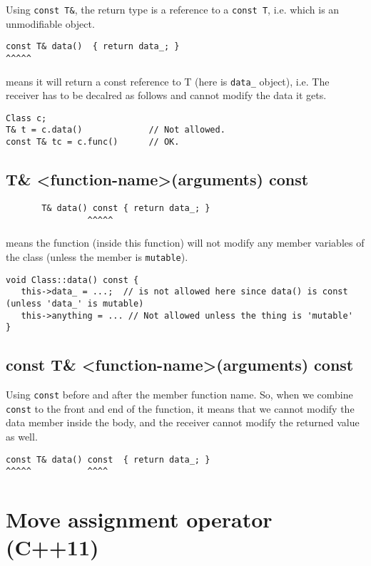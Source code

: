 Using \verb!const T&!, the return type is a reference to a \verb!const T!, i.e.
which is an unmodifiable object.

\begin{verbatim}
const T& data()  { return data_; }
^^^^^
\end{verbatim}
means it will return a const reference to T (here is \verb!data_! object), i.e.
The receiver has to be decalred as follows and cannot modify the data it gets.
\begin{verbatim}
Class c;
T& t = c.data()             // Not allowed.
const T& tc = c.func()      // OK.
\end{verbatim}


\subsection{T\& <function-name>(arguments) const}

\begin{verbatim}
       T& data() const { return data_; }
                ^^^^^
\end{verbatim}
means the function (inside this function) will not modify any member variables
of the class (unless the member is \verb!mutable!).

\begin{verbatim}
void Class::data() const {
   this->data_ = ...;  // is not allowed here since data() is const (unless 'data_' is mutable)
   this->anything = ... // Not allowed unless the thing is 'mutable'
}
\end{verbatim}


\subsection{const T\& <function-name>(arguments) const}

Using \verb!const! before and after the member function name. So, when we
combine \verb!const! to the front and end of the function, it means that we
cannot modify the data member inside the body, and the receiver cannot modify
the returned value as well.
\begin{verbatim}
const T& data() const  { return data_; }
^^^^^           ^^^^

\end{verbatim}

\section{Move assignment operator (C++11)}
\label{sec:move-assignment-operator-C++11}

